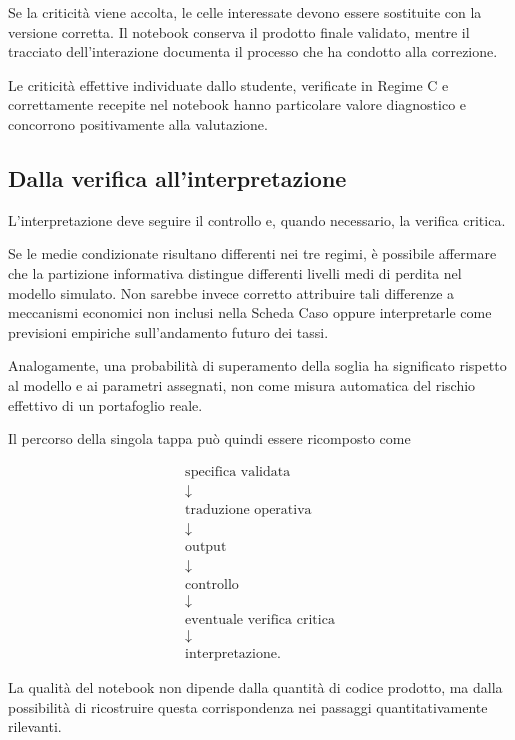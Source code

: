 Se la criticit\`{a} viene accolta, le celle interessate devono essere
sostituite con la versione corretta. Il notebook conserva il prodotto finale
validato, mentre il tracciato dell'interazione documenta il processo che ha
condotto alla correzione.

Le criticit\`a effettive individuate dallo studente, verificate in Regime C
e correttamente recepite nel notebook hanno particolare valore diagnostico e
concorrono positivamente alla valutazione.

\subsection{Dalla verifica all'interpretazione}

L'interpretazione deve seguire il controllo e, quando necessario, la verifica
critica.

Se le medie condizionate risultano differenti nei tre regimi, \`{e} possibile
affermare che la partizione informativa distingue differenti livelli medi di
perdita nel modello simulato. Non sarebbe invece corretto attribuire tali
differenze a meccanismi economici non inclusi nella Scheda Caso oppure
interpretarle come previsioni empiriche sull'andamento futuro dei tassi.

Analogamente, una probabilit\`{a} di superamento della soglia ha significato
rispetto al modello e ai parametri assegnati, non come misura automatica del
rischio effettivo di un portafoglio reale.

Il percorso della singola tappa pu\`{o} quindi essere ricomposto come

\[
\begin{array}{c}
\text{specifica validata}
\\[3pt]
\downarrow
\\[3pt]
\text{traduzione operativa}
\\[3pt]
\downarrow
\\[3pt]
\text{output}
\\[3pt]
\downarrow
\\[3pt]
\text{controllo}
\\[3pt]
\downarrow
\\[3pt]
\text{eventuale verifica critica}
\\[3pt]
\downarrow
\\[3pt]
\text{interpretazione}.
\end{array}
\]

La qualit\`{a} del notebook non dipende dalla quantit\`{a} di codice prodotto,
ma dalla possibilit\`{a} di ricostruire questa corrispondenza nei passaggi
quantitativamente rilevanti.


